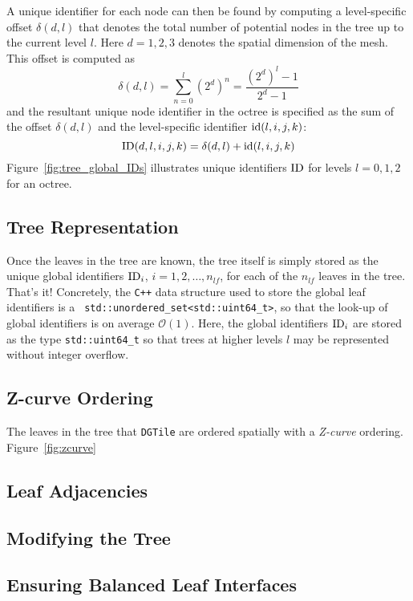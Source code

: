

A unique identifier for each node can then be found by computing a
level-specific offset $\delta(d,l)$ that denotes the total number of potential
nodes in the tree up to the current level $l$. Here $d=1,2,3$ denotes the
spatial dimension of the mesh. This offset is computed as
%
\begin{equation}
\delta(d,l) = \sum_{n=0}^l (2^d)^n = \frac{(2^d)^l - 1}{2^d - 1}
\end{equation}
%
and the resultant unique node identifier in the octree is specified as the
sum of the offset $\delta(d,l)$ and the level-specific identifier
$\text{id}(l,i,j,k)$:
%
\begin{equation}
\text{ID}(d,l,i,j,k) = \delta(d,l) + \text{id}(l,i,j,k)
\end{equation}
%
Figure~\ref{fig:tree_global_IDs} illustrates unique identifiers $\text{ID}$ for
levels $l=0,1,2$ for an octree.

\subsection{Tree Representation}

Once the leaves in the tree are known, the tree itself is simply stored as
the unique global identifiers $\text{ID}_i$, $i=1,2,\dots,n_{lf}$, for each of
the $n_{lf}$ leaves in the tree. That's it! Concretely, the \texttt{C++} data
structure used to store the global leaf identifiers is a \texttt{
std::unordered\_set<std::uint64\_t>}, so that the look-up of global
identifiers is on average $\mathcal{O}(1)$. Here, the global identifiers
$\text{ID}_i$ are stored as the type \texttt{std::uint64\_t} so that trees at
higher levels $l$ may be represented without integer overflow.

\subsection{Z-curve Ordering}



The leaves in the tree that \texttt{DGTile} are ordered spatially with a
\emph{Z-curve} ordering. Figure~\ref{fig:zcurve}


\subsection{Leaf Adjacencies}

\subsection{Modifying the Tree}

\subsection{Ensuring Balanced Leaf Interfaces}
